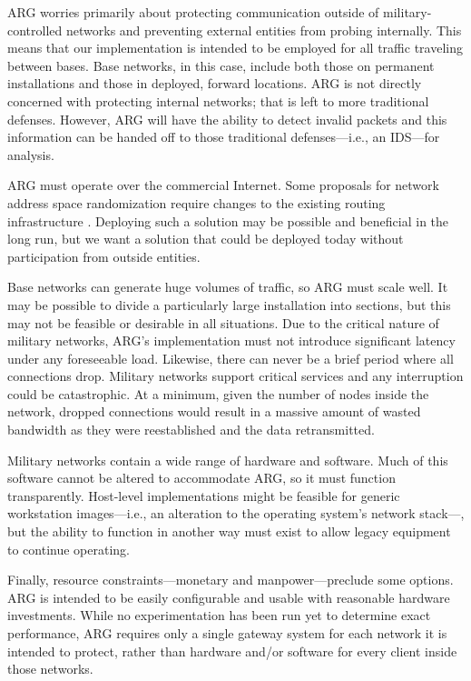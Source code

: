 \par ARG worries primarily about protecting communication outside of military-controlled networks and preventing external entities from probing internally. This means that our implementation is intended to be employed for all traffic traveling between bases. Base networks, in this case, include both those on permanent installations and those in deployed, forward locations. ARG is not directly concerned with protecting internal networks; that is left to more traditional defenses. However, ARG will have the ability to detect invalid packets and this information can be handed off to those traditional defenses---i.e., an IDS---for analysis.

\par ARG must operate over the commercial Internet. Some proposals for network address space randomization require changes to the existing routing infrastructure \cite{CONTRA}. Deploying such a solution may be possible and beneficial in the long run, but we want a solution that could be deployed today without participation from outside entities.

\par Base networks can generate huge volumes of traffic, so ARG must scale well. It may be possible to divide a particularly large installation into sections, but this may not be feasible or desirable in all situations. Due to the critical nature of military networks, ARG's implementation must not introduce significant latency under any foreseeable load. Likewise, there can never be a brief period where all connections drop. Military networks support critical services and any interruption could be catastrophic. At a minimum, given the number of nodes inside the network, dropped connections would result in a massive amount of wasted bandwidth as they were reestablished and the data retransmitted.

\par Military networks contain a wide range of hardware and software. Much of this software cannot be altered to accommodate ARG, so it must function transparently. Host-level implementations might be feasible for generic workstation images---i.e., an alteration to the operating system's network stack---, but the ability to function in another way must exist to allow legacy equipment to continue operating.

\par Finally, resource constraints---monetary and manpower---preclude some options. ARG is intended to be easily configurable and usable with reasonable hardware investments. While no experimentation has been run yet to determine exact performance, ARG requires only a single gateway system for each network it is intended to protect, rather than hardware and/or software for every client inside those networks.

